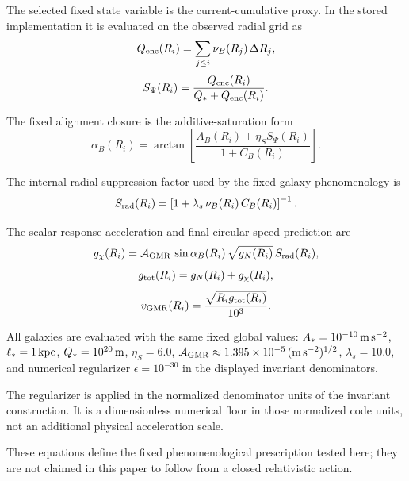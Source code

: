 ﻿\documentclass[twocolumn,linenumbers]{aastex701}
\begin{document}
The selected fixed state variable is the current-cumulative proxy. In the stored implementation it is evaluated on the observed radial grid as
\begin{equation}
Q_{\rm enc}(R_i) = \sum_{j\le i} \nu_B(R_j)\,\Delta R_j,
\end{equation}
\begin{equation}
S_\Psi(R_i) = \frac{Q_{\rm enc}(R_i)}{Q_* + Q_{\rm enc}(R_i)}.
\end{equation}

The fixed alignment closure is the additive-saturation form
\begin{equation}
\alpha_B(R_i) = \arctan\left[\frac{A_B(R_i) + \eta_S S_\Psi(R_i)}{1 + C_B(R_i)}\right].
\end{equation}

The internal radial suppression factor used by the fixed galaxy phenomenology is
\begin{equation}
S_{\rm rad}(R_i) = \left[1 + \lambda_s\,\nu_B(R_i)\,C_B(R_i)\right]^{-1}.
\end{equation}

The scalar-response acceleration and final circular-speed prediction are
\begin{equation}
g_\chi(R_i) = \mathcal{A}_{\rm GMR}\,\sin\alpha_B(R_i)\,\sqrt{g_N(R_i)}\,S_{\rm rad}(R_i),
\end{equation}
\begin{equation}
g_{\rm tot}(R_i) = g_N(R_i) + g_\chi(R_i),
\end{equation}
\begin{equation}
v_{\rm GMR}(R_i) = \frac{\sqrt{R_i g_{\rm tot}(R_i)}}{10^3}.
\end{equation}

All galaxies are evaluated with the same fixed global values: $A_* = 10^{-10}\,{\rm m\,s^{-2}}$, $\ell_* = 1\,{\rm kpc}$, $Q_* = 10^{20}\,{\rm m}$, $\eta_S = 6.0$, $\mathcal{A}_{\rm GMR} \approx 1.395\times10^{-5}\,(\mathrm{m\,s^{-2}})^{1/2}$, $\lambda_s = 10.0$, and numerical regularizer $\epsilon = 10^{-30}$ in the displayed invariant denominators.

The regularizer is applied in the normalized denominator units of the invariant construction. It is a dimensionless numerical floor in those normalized code units, not an additional physical acceleration scale.

These equations define the fixed phenomenological prescription tested here; they are not claimed in this paper to follow from a closed relativistic action.
\end{document}
